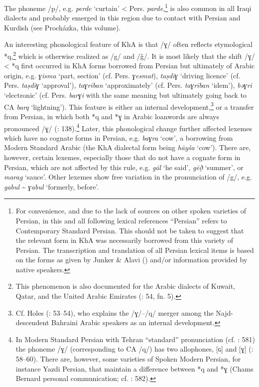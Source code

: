 \documentclass[output=paper,nonflat]{langsci/langscibook}
\begin{document}
The phoneme /p/, e.g. \textit{perde} ‘curtain’ < Pers. \textit{parde},\footnote{For convenience, and due to the lack of sources on other spoken varieties of Persian, in this and all following lexical references ``Persian'' refers to Contemporary Standard Persian. This should not be taken to suggest that the relevant form in KhA was necessarily borrowed from this variety of Persian. The transcription and translation of all Persian lexical items is based on the forms as given by Junker \& Alavi (\citeyear{JunkerAlavi2002}) and/or information provided by native speakers.} is also common in all Iraqi dialects and probably emerged in this region due to contact with Persian and Kurdish (see Procházka, this volume). 

An interesting phonological feature of KhA is that /ɣ/ often reflects etymological *q,\footnote{This phenomenon is also documented for the Arabic dialects of Kuwait, Qatar, and the United Arabic Emirates (\citealt{Holes2016}: 54, fn. 5).} which is otherwise realized as /g/ and /ǧ/. It is most likely that the shift /ɣ/ < *q first occurred in KhA forms borrowed from Persian but ultimately of Arabic origin, e.g. \textit{ɣisma} ‘part, section’ (cf. Pers. \textit{ɣesmat}), \textit{taṣdīɣ} ‘driving licence’ (cf. Pers. \textit{taṣdīɣ} `approval'), \textit{taɣrīban} ‘approximately’ (cf. Pers. \textit{taɣrīban} `idem'), \textit{bəɣri} ‘electronic’ (cf. Pers. \textit{barɣi} with the same meaning but ultimately going back to CA \textit{barq} ‘lightning’). This feature is either an internal development,\footnote{Cf. Holes (\citeyear{Holes2016}: 53–54), who explains the /ɣ/–/q/ merger among the Najd-descendent Bahraini Arabic speakers as an internal development.} or a transfer from Persian, in which both *q and *ɣ in Arabic loanwords are always pronounced /ɣ/ (\citealt{MatrasShabibi2007}: 138).\footnote{In Modern Standard Persian with Tehran ``standard'' pronunciation (cf. \citealt{Paul2018}: 581) the phoneme /ɣ/ (corresponding to CA /q/) has two allophones, [ɢ] and [ɣ] (\citealt{Majidi1986}: 58–60). There are, however, some varieties of Spoken Modern Persian, for instance Yazdi Persian, that maintain a difference between *q and *ɣ (Chams Bernard  personal communication; cf. \citealt{Paul2018}: 582).} Later, this phonological change further affected lexemes which have no cognate forms in Persian, e.g. \textit{baɣra} `cow', a borrowing from Modern Standard Arabic (the KhA dialectal form being \textit{hāyša} `cow'). There are, however, certain lexemes, especially those that do not have a cognate form in Persian, which are not affected by this rule, e.g. \textit{gāl} `he said', \textit{gēð̣} ‘summer’, or \textit{marag} ‘sauce’. Other lexemes show free variation in the pronunciation of /g/, e.g. \textit{gabul} \~{} \textit{ɣabul} `formerly, before'.
\end{document}
